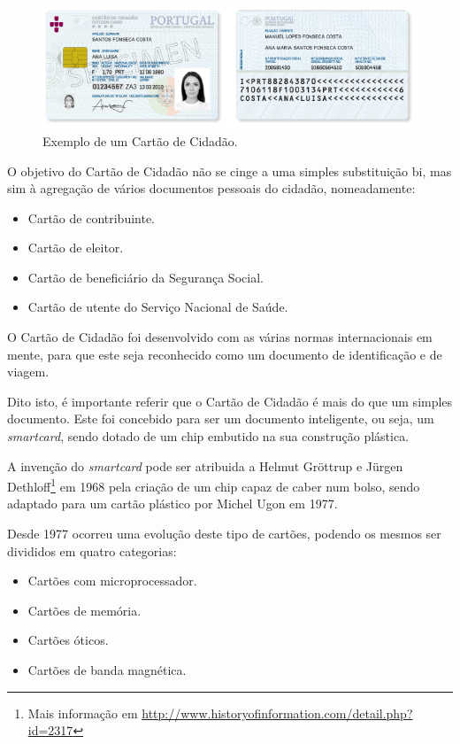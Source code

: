 \begin{figure}[h]
    \centering
    \includegraphics[width=\textwidth]{img/cc/CartaoCidadao.png}
    \caption{Exemplo de um Cartão de Cidadão\cite{ccPic}.}
\end{figure}

O objetivo do Cartão de Cidadão não se cinge a uma simples substituição \gls{bi}, mas sim à agregação de vários documentos pessoais do cidadão, nomeadamente:

\begin{itemize}
    \item Cartão de contribuinte.
    \item Cartão de eleitor.
    \item Cartão de beneficiário da Segurança Social.
    \item Cartão de utente do Serviço Nacional de Saúde.
\end{itemize}

O Cartão de Cidadão foi desenvolvido com as várias normas internacionais em mente, para que este seja reconhecido como um documento de identificação e de viagem.

Dito isto, é importante referir que o Cartão de Cidadão é mais do que um simples documento. Este foi concebido para ser um documento inteligente, ou seja, um \emph{smartcard}, sendo dotado de um chip embutido na sua construção plástica.

A invenção do \emph{smartcard} pode ser atribuida a Helmut Gröttrup e Jürgen Dethloff\footnote{Mais informação em \url{http://www.historyofinformation.com/detail.php?id=2317}} em 1968 pela criação de um chip capaz de caber num bolso, sendo adaptado para um cartão plástico por Michel Ugon em 1977.

Desde 1977 ocorreu uma evolução deste tipo de cartões, podendo os mesmos ser divididos em quatro categorias:

\begin{itemize}
    \item Cartões com microprocessador.
    \item Cartões de memória.
    \item Cartões óticos.
    \item Cartões de banda magnética.
\end{itemize}

